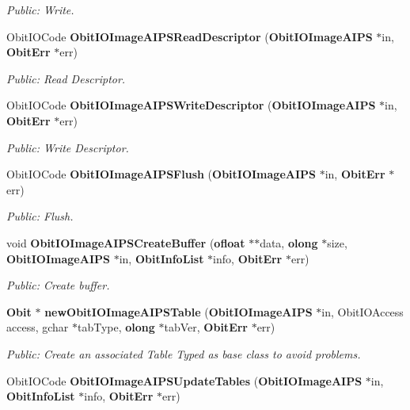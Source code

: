 \begin{CompactItemize}
\begin{CompactList}\small\item\em Public: Write. \item\end{CompactList}\item 
Obit\-IOCode {\bf Obit\-IOImage\-AIPSRead\-Descriptor} ({\bf Obit\-IOImage\-AIPS} $\ast$in, {\bf Obit\-Err} $\ast$err)
\begin{CompactList}\small\item\em Public: Read Descriptor. \item\end{CompactList}\item 
Obit\-IOCode {\bf Obit\-IOImage\-AIPSWrite\-Descriptor} ({\bf Obit\-IOImage\-AIPS} $\ast$in, {\bf Obit\-Err} $\ast$err)
\begin{CompactList}\small\item\em Public: Write Descriptor. \item\end{CompactList}\item 
Obit\-IOCode {\bf Obit\-IOImage\-AIPSFlush} ({\bf Obit\-IOImage\-AIPS} $\ast$in, {\bf Obit\-Err} $\ast$err)
\begin{CompactList}\small\item\em Public: Flush. \item\end{CompactList}\item 
void {\bf Obit\-IOImage\-AIPSCreate\-Buffer} ({\bf ofloat} $\ast$$\ast$data, {\bf olong} $\ast$size, {\bf Obit\-IOImage\-AIPS} $\ast$in, {\bf Obit\-Info\-List} $\ast$info, {\bf Obit\-Err} $\ast$err)
\begin{CompactList}\small\item\em Public: Create buffer. \item\end{CompactList}\item 
{\bf Obit} $\ast$ {\bf new\-Obit\-IOImage\-AIPSTable} ({\bf Obit\-IOImage\-AIPS} $\ast$in, Obit\-IOAccess access, gchar $\ast$tab\-Type, {\bf olong} $\ast$tab\-Ver, {\bf Obit\-Err} $\ast$err)
\begin{CompactList}\small\item\em Public: Create an associated Table Typed as base class to avoid problems. \item\end{CompactList}\item 
Obit\-IOCode {\bf Obit\-IOImage\-AIPSUpdate\-Tables} ({\bf Obit\-IOImage\-AIPS} $\ast$in, {\bf Obit\-Info\-List} $\ast$info, {\bf Obit\-Err} $\ast$err)
$$
\end{CompactItemize}
